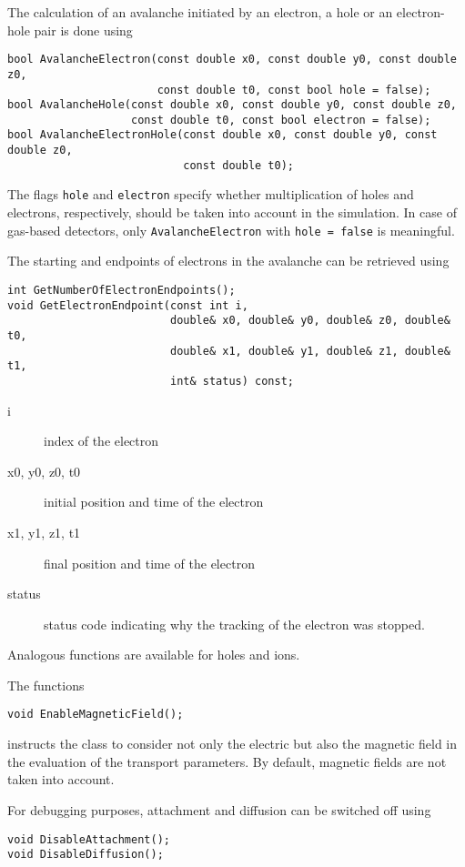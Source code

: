 The calculation of an avalanche initiated by an electron, 
a hole or an electron-hole pair is done using
\begin{lstlisting}
bool AvalancheElectron(const double x0, const double y0, const double z0,
                       const double t0, const bool hole = false);
bool AvalancheHole(const double x0, const double y0, const double z0,
                   const double t0, const bool electron = false);
bool AvalancheElectronHole(const double x0, const double y0, const double z0,
                           const double t0);
\end{lstlisting}
The flags \texttt{hole} and \texttt{electron} specify whether 
multiplication of holes and electrons, respectively, should be 
taken into account in the simulation. 
In case of gas-based detectors, only \texttt{AvalancheElectron} with 
\texttt{hole = false} is meaningful. 

The starting and endpoints of electrons in the avalanche can be 
retrieved using
\begin{lstlisting}
int GetNumberOfElectronEndpoints();
void GetElectronEndpoint(const int i,
                         double& x0, double& y0, double& z0, double& t0,
                         double& x1, double& y1, double& z1, double& t1,
                         int& status) const;
\end{lstlisting}
\begin{description}
  \item[i] index of the electron
  \item[x0, y0, z0, t0] initial position and time of the electron
  \item[x1, y1, z1, t1] final position and time of the electron
  \item[status] status code indicating why the tracking of the electron was stopped.  
\end{description}
Analogous functions are available for holes and ions.

The functions
\begin{lstlisting}
void EnableMagneticField();
\end{lstlisting}
instructs the class to consider not only the electric but also the magnetic field
in the evaluation of the transport parameters.  
By default, magnetic fields are not taken into account.

For debugging purposes, attachment and diffusion can be switched off using
\begin{lstlisting}
void DisableAttachment();
void DisableDiffusion();
\end{lstlisting}

